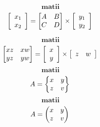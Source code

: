 \documentclass[10pt]{article}
\begin{document}
$$\textbf{matii}$$
\[
    \left[ \begin{array}{c} 
    x_1 \\ 
    x_2 
    \end{array} \right] 
    = \begin{bmatrix} 
    A & B \\ 
    C & D 
    \end{bmatrix} 
    \times 
    \left[ 
    \begin{array}{c} 
    y_1 \\ 
    y_2 
    \end{array} 
    \right] \\
\]

$$\textbf{matii}$$
\[
    \begin{bmatrix} 
    xz & xw \\ 
    yz & yw 
    \end{bmatrix} = \left[ 
    \begin{array}{c} 
    x \\ 
    y 
    \end{array} 
    \right] \times \left[ 
    \begin{array}{cc} 
    z & w 
    \end{array} 
    \right]\\
\]
$$\textbf{matii}$$
\[
    A =\begin{Bmatrix} 
    x & y \\ 
    z & v 
    \end{Bmatrix} \\ 
\]
$$\textbf{matii}$$
\[
    A = \begin{pmatrix} 
    x & y \\ 
    z & v 
    \end{pmatrix} \\
\]
\end{document}
